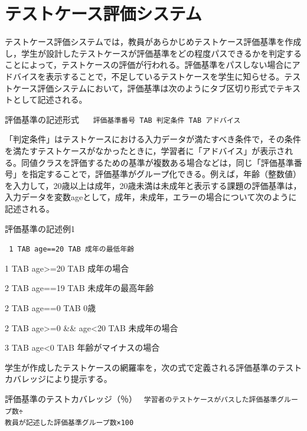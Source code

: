 \documentclass{tpu-sotu}
\begin{document}
\section{テストケース評価システム}
テストケース評価システムでは，教員があらかじめテストケース評価基準を作成し，学生が設計したテストケースが評価基準をどの程度パスできるかを判定することによって，テストケースの評価が行われる。評価基準をパスしない場合にアドバイスを表示することで，不足しているテストケースを学生に知らせる。テストケース評価システムにおいて，評価基準は次のようにタブ区切り形式でテキストとして記述される。\\
\begin{minipage}[b]{\textwidth}
\begin{itembox}[l]{評価基準の記述形式}
{\tt
　評価基準番号 TAB 判定条件 TAB アドバイス
}
\end{itembox}
\end{minipage}

「判定条件」はテストケースにおける入力データが満たすべき条件で，その条件を満たすテストケースがなかったときに，学習者に「アドバイス」が表示される。同値クラスを評価するための基準が複数ある場合などは，同じ「評価基準番号」を指定することで，評価基準がグループ化できる。例えば，年齢（整数値）を入力して，20歳以上は成年，20歳未満は未成年と表示する課題の評価基準は，入力データを変数ageとして，成年，未成年，エラーの場合について次のように記述される。\\
\begin{minipage}[b]{\textwidth}
\begin{itembox}[l]{評価基準の記述例1}
{\tt
1 TAB age==20 TAB 成年の最低年齢

1 TAB age>=20 TAB 成年の場合

2 TAB age==19 TAB 未成年の最高年齢

2 TAB age==0 TAB 0歳

2 TAB age>=0 \&\& age<20 TAB 未成年の場合

3 TAB age<0 TAB 年齢がマイナスの場合
}
\end{itembox}
\end{minipage}

学生が作成したテストケースの網羅率を，次の式で定義される評価基準のテストカバレッジにより提示する。\\
\begin{minipage}[b]{\textwidth}
\begin{itembox}[l]{評価基準のテストカバレッジ（％）}
{\tt
学習者のテストケースがパスした評価基準グループ数÷\\教員が記述した評価基準グループ数×100
}
\end{itembox}
\end{minipage}
\end{document}
